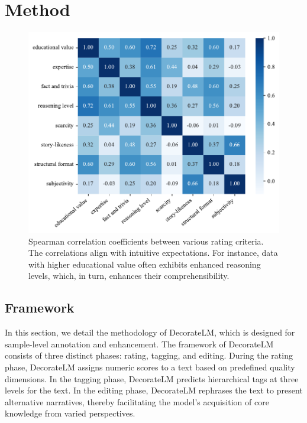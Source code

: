 \documentclass[11pt]{article}
\begin{document}
\section{Method}
\label{sec:headings}
\begin{figure}[t]
    \centering
    \includegraphics[width=\columnwidth]
    {figs/spearmanscore.pdf}
    \caption{Spearman correlation coefficients between various rating criteria. The correlations align with intuitive expectations. For instance, data with higher educational value often exhibits enhanced reasoning levels, which, in turn, enhances their comprehensibility.
    }
    \label{fig:spearmanscore}
\end{figure}
\subsection{Framework}

In this section, we detail the methodology of DecorateLM, which is designed for sample-level annotation and enhancement. The framework of DecorateLM consists of three distinct phases: rating, tagging, and editing. During the rating phase, DecorateLM assigns numeric scores to a text based on predefined quality dimensions. In the tagging phase, DecorateLM predicts hierarchical tags at three levels for the text. In the editing phase, DecorateLM rephrases the text to present alternative narratives, thereby facilitating the model's acquisition of core knowledge from varied perspectives.
\end{document}
